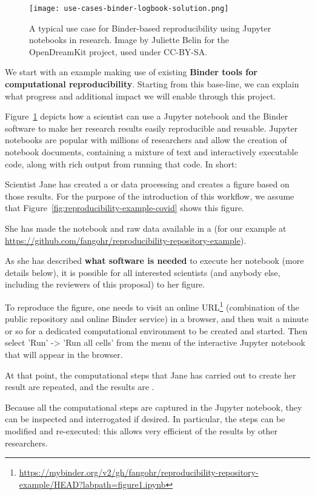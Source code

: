 \begin{figure}[htb]\centering
  \texttt{[image: use-cases-binder-logbook-solution.png]}
  \caption{A typical use case for Binder-based reproducibility using Jupyter notebooks in research.
            Image by Juliette Belin for the OpenDreamKit project, used under
            CC-BY-SA.}\label{fig:use-cases-binder}
\end{figure}

We start with an example making use of existing \textbf{Binder
tools for computational reproducibility}. Starting from this base-line, we can
explain what progress and additional impact we will enable through this project.

Figure~\ref{fig:use-cases-binder} depicts how a scientist can use a Jupyter
notebook and the Binder software to make her research results easily
reproducible and reusable. Jupyter notebooks are popular with millions of researchers and allow the creation of notebook
documents, containing a mixture of text and interactively executable code, along with rich output from
running that code. In short:
\begin{compactitem}
\item Scientist Jane has created a  or
  data processing and creates a figure based on those results. For the purpose
  of the introduction of this workflow, we assume that
  Figure~\ref{fig:reproducibility-example-covid} shows this figure.

\item She has made the notebook and raw data available in a 
  (for our example at\newline
  \mbox{\url{https://github.com/fangohr/reproducibility-repository-example}}).

\item As she has described \textbf{what software is needed} to execute her notebook (more
  details below), it is possible for all interested scientists (and anybody
  else, including the reviewers of this proposal) to  her
  figure.

  To reproduce the figure, one needs to visit an online URL\footnote{\url{https://mybinder.org/v2/gh/fangohr/reproducibility-repository-example/HEAD?labpath=figure1.ipynb}}
  (combination of the public repository and online Binder service) in a browser, and then wait a minute or so for a dedicated computational
  environment to be created and started. Then select 'Run' -> 'Run all cells'
  from the menu of the interactive Jupyter notebook that will appear in the
  browser.

  At that point, the computational steps that Jane has carried out to create her
  result are repeated, and the results are .

\item Because all the computational steps are captured in the Jupyter notebook,
  they can be inspected and interrogated if desired. In particular, the steps
  can be modified and re-executed: this allows very efficient  of
  the results by other researchers.
\end{compactitem}

